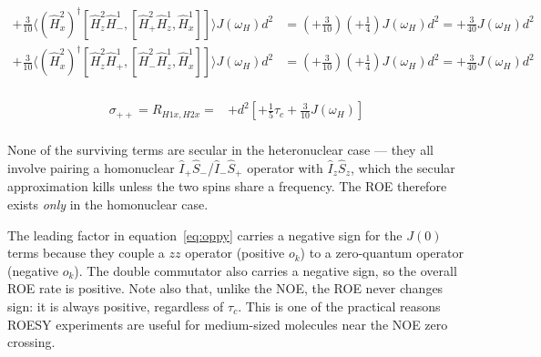 \documentclass[notitlepage,11pt]{article}
\begin{document}
\begin{small}
\begin{equation*}
\begin{array}{rl}
 +\frac{3}{10}\langle (\hat{H}^2_x)^{\dagger} [\hat{H}^2_z\hat{H}^1_- ,[\hat{H}^2_+ \hat{H}^1_z,\hat{H}^1_x]] \rangle J\left(\omega_H\right)d^2 &= ( +\frac{3}{10})( +\frac{1}{4})J\left(\omega_H\right) d^2 =  +\frac{3}{40}J\left(\omega_H\right) d^2\\

 +\frac{3}{10}\langle (\hat{H}^2_x)^{\dagger} [\hat{H}^2_z\hat{H}^1_+ ,[\hat{H}^2_- \hat{H}^1_z,\hat{H}^1_x]] \rangle J\left(\omega_H\right)d^2 &= ( +\frac{3}{10})( +\frac{1}{4})J\left(\omega_H\right) d^2 =  +\frac{3}{40}J\left(\omega_H\right) d^2\\

\end{array}\end{equation*}\end{small}

\begin{small}
\begin{equation}\begin{array}{rl}
    \sigma_{++}= R_{H1x,H2x}=
& + d^2 \left[ +\frac{1}{5} \tau_c +\frac{3}{10} J\left(\omega_H\right)\right]\\
\end{array}\end{equation}
\end{small}


None of the surviving terms are secular in the heteronuclear case — they all involve pairing a homonuclear $\hat{I}_+\hat{S}_-$/$\hat{I}_-\hat{S}_+$ operator with $\hat{I}_z\hat{S}_z$, which the secular approximation kills unless the two spins share a frequency. The ROE therefore exists \emph{only} in the homonuclear case.

The leading factor in equation~\ref{eq:oppy} carries a negative sign for the $J(0)$ terms because they couple a $zz$ operator (positive $o_k$) to a zero-quantum operator (negative $o_k$). The double commutator also carries a negative sign, so the overall ROE rate is positive. Note also that, unlike the NOE, the ROE never changes sign: it is always positive, regardless of $\tau_c$. This is one of the practical reasons ROESY experiments are useful for medium-sized molecules near the NOE zero crossing.



  
  




\end{document}
